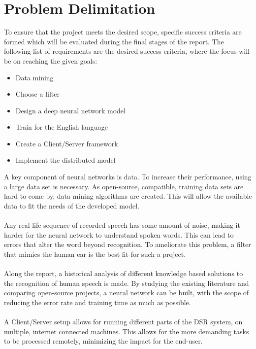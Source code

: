 
\section{Problem Delimitation}
To ensure that the project meets the desired scope,
specific success criteria are formed which will be
evaluated during the final stages of the report.
The following list of requirements are the desired
success criteria, where the focus will be on reaching
the given goals:
\begin{itemize}
	\item Data mining
	\item Choose a filter
	\item Design a deep neural network model
	\item Train for the English language
	\item Create a Client/Server framework
	\item Implement the distributed model
\end{itemize}
A key component of neural networks is data. To increase their performance, using a large data set is necessary. As open-source, compatible, training data sets are hard to come by, data mining algorithms are created. This will allow the available data to fit the needs of the developed model.\\\\
Any real life sequence of recorded speech has some amount of noise, making it harder for the neural network to understand spoken words.
This can lead to errors that alter the word beyond recognition. 
To ameliorate this problem, a filter that mimics the human
ear is the best fit for such a project.\\\\
Along the report, a historical analysis of different knowledge
based solutions to the recognition of human speech is made.
By studying the existing literature and comparing open-source projects, a neural network can be built, with the scope of reducing the error rate and training time as much
as possible.\\\\
A Client/Server setup allows for running different parts of the DSR system, on multiple, internet connected machines. This allows for the more demanding tasks to be processed remotely, minimizing the impact for the end-user.
